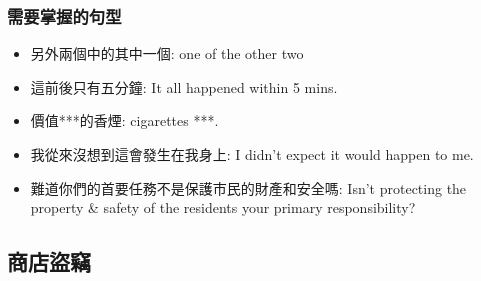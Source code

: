 \subsubsection*{需要掌握的句型}
\begin{multicols}{2}
\begin{itemize}
  \itemsep0em
  \item 另外兩個中的其中一個: one of the other two
  \item 這前後只有五分鐘: It all happened within 5 mins.
  \item 價值***的香煙: cigarettes  ***.
  \item 我從來沒想到這會發生在我身上: I didn't expect it would happen to me.
  \item 難道你們的首要任務不是保護市民的財產和安全嗎: Isn't protecting the property \& safety of the residents your primary responsibility? 
\end{itemize}
\end{multicols}

\subsection{商店盜竊}
